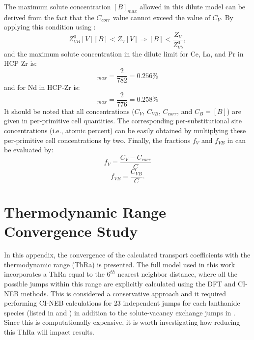 \documentclass[preprint,12pt]{elsarticle}
\begin{document}
The maximum solute concentration $[B]_{max}$ allowed in this dilute model can be derived from the fact that the $C_{corr}$ value cannot exceed the value of $C_V$. By applying this condition using :
\begin{equation}
    Z_{VB}^0 [V] [B] < Z_V [V] \Longrightarrow [B] < \frac{Z_V}{Z_{Vb}^0},
\end{equation}
and the maximum solute concentration in the dilute limit for Ce, La, and Pr in HCP Zr is:
\begin{equation}
        [B]_{max} = \frac{2}{782} = 0.256\%
\end{equation}
and for Nd in HCP-Zr is:
\begin{equation}
        [B]_{max} = \frac{2}{776} = 0.258\%
\end{equation}
It should be noted that all concentrations ($C_V$, $C_{VB}$, $C_{corr}$, and $C_B = [B]$) are given in per-primitive cell quantities. The corresponding per-substitutional site concentrations (i.e., atomic percent) can be easily obtained by multiplying these per-primitive cell concentrations by two. 
Finally, the fractions $f_V$ and $f_{VB}$ in  can be evaluated by:
\begin{equation}
    f_V = \frac{C_V - C_{corr}}{C}
\end{equation}
\begin{equation}
    f_{VB} = \frac{C_{VB}}{C}.
\end{equation}

\FloatBarrier

\section{Thermodynamic Range Convergence Study}
\label{appendix_conv_th_ra}

\setcounter{figure}{0}


In this appendix, the convergence of the calculated transport coefficients with the thermodynamic range (ThRa) is presented. The full model used in this work incorporates a ThRa equal to the $6^{th}$ nearest neighbor distance, where all the possible jumps within this range are explicitly calculated using the DFT and CI-NEB methods. This is considered a conservative approach and it required performing CI-NEB calculations for 23 independent jumps for each lanthanide species (listed in  and ) in addition to the solute-vacancy exchange jumps in . Since this is computationally expensive, it is worth investigating how reducing this ThRa will impact results.
\end{document}
